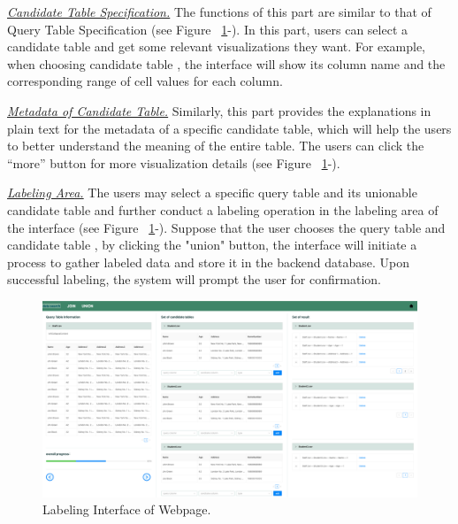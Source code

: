 \noindent \underline{\textit{Candidate Table Specification.}} The functions of this part are similar to that of Query Table Specification (see Figure ~\ref{fig:interface}-). In this part, users can select a candidate table and get some relevant visualizations they want. For example, when choosing candidate table , the interface will show its column name and the corresponding range of cell values for each column.

\noindent \underline{\textit{Metadata of Candidate Table.}}  Similarly, this part provides the explanations in plain text for the metadata of a specific candidate table, which will help the users to better understand the meaning of the entire table.  The users can click the “more” button for more visualization details (see Figure ~\ref{fig:interface}-).

\noindent \underline{\textit{Labeling Area.}} The users may select a specific query table and its unionable candidate table and further conduct a labeling operation in the labeling area of the interface (see Figure ~\ref{fig:interface}-). Suppose that the user chooses the query table  and candidate table , by clicking the "union" button, the interface will initiate a process to gather labeled data and store it in the backend database. Upon successful labeling, the system will prompt the user for confirmation.


\begin{figure}[h]
	\centering
	\includegraphics[width=1.0\linewidth]{fig/interface.jpg}
	\caption{Labeling Interface of Webpage.}
	\label{fig:interface}
\end{figure}

